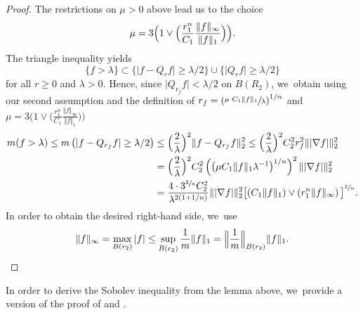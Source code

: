 \documentclass[JEP,XML,SOM,Unicode,published]{cedram}
\theoremstyle{plain}
\theoremstyle{definition}
\begin{document}
\begin{proof}
The restrictions on $\mu>0$ above lead us to the choice
\[
\mu= 3\Bigl(1\vee \Bigl(\frac{r_1^n}{C_1} \frac{\Vert f\Vert_\infty}{\Vert f\Vert_1}\Bigr)\Bigr).
\]
The triangle inequality yields
\[
\{f> \lambda \}\subset \{\vert f-Q_{r}f\vert \geq\lambda/2\}\cup\{\vert Q_{r}f\vert\geq \lambda/2\}
\]
for all $r\geq 0$ and $\lambda>0$. Hence, since $\vert Q_{r_f}f\vert <\lambda/2$ on $B (R_2)$, we~obtain using our second assumption and the definition of $ r_{f} =\left(\sfrac{\mu\ C_1\Vert f\Vert_1}{\lambda}\right)^{1/n}$ and \hbox{$ \mu=3\bigl(1\vee \bigl(\frac{r_1^n}{C_1} \frac{\Vert f\Vert_\infty}{\Vert f\Vert_1}\bigr)\bigr) $}
\begin{align*}
m(f>\lambda)
\leq m\left(\vert f-Q_{r_f}f\vert \geq \lambda/2\right)
&\leq \Bigl(\frac{2}{\lambda}\Bigr)^2\Vert f-Q_{r_f}f\Vert_2^2
\leq
\Bigl(\frac{2}{\lambda}\Bigr)^2C_2^2r_f^2\Vert| \nabla f|\Vert_2^2
\\
&=
\Bigl(\frac{2}{\lambda}\Bigr)^2
C_2^2
\left(\left(
\mu C_1\Vert f\Vert_1\lambda^{-1}\right)^{1/n}\right)^2\Vert| \nabla f|\Vert_2^2
\\
&= \frac{4\cdot 3^{\sfrac{2}{n}} C_2^2}{\lambda^{2(1+1/n)}}
\Vert |\nabla f|\Vert_2^2\big[
(C_1\Vert f\Vert_1)\vee \left(r_1^n \Vert f\Vert_\infty
\right)\big]^{\sfrac{2}{n}}.
\end{align*}
In order to obtain the desired right-hand side, we~use
\[
\Vert f\Vert_\infty=\max_{B(r_2)}|f|
\leq \sup_{B(r_2)}\frac1m \Vert f\Vert_1=\Bigl\Vert\frac1m\Bigr\Vert_{B(r_2)} \Vert f\Vert_1. \hfill\qedhere
\]
\end{proof}

In order to derive the Sobolev inequality from the lemma above, we~provide a version of the proof of \cite[Th.\,4.1]{BakryCLS-95} and \cite{Barlow-book,Delmotte-97}.
\end{document}
